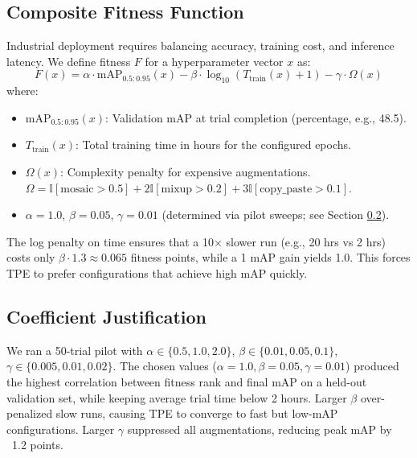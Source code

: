 \documentclass[10pt,twocolumn,letterpaper]{article}
\begin{document}
\subsection{Composite Fitness Function}
Industrial deployment requires balancing accuracy, training cost, and inference latency. We define fitness $F$ for a hyperparameter vector $x$ as:
\begin{equation}
F(x) = \alpha \cdot \text{mAP}_{0.5:0.95}(x) - \beta \cdot \log_{10}(T_{\text{train}}(x) + 1) - \gamma \cdot \Omega(x)
\label{eq:fitness}
\end{equation}
where:
\begin{itemize}
    \item $\text{mAP}_{0.5:0.95}(x)$: Validation mAP at trial completion (percentage, e.g., 48.5).
    \item $T_{\text{train}}(x)$: Total training time in hours for the configured epochs.
    \item $\Omega(x)$: Complexity penalty for expensive augmentations. $\Omega = \mathbb{I}[\text{mosaic}>0.5] + 2\mathbb{I}[\text{mixup}>0.2] + 3\mathbb{I}[\text{copy\_paste}>0.1]$.
    \item $\alpha=1.0$, $\beta=0.05$, $\gamma=0.01$ (determined via pilot sweeps; see Section \ref{sec:coeff}).
\end{itemize}
The log penalty on time ensures that a 10$\times$ slower run (e.g., 20 hrs vs 2 hrs) costs only $\beta \cdot 1.3 \approx 0.065$ fitness points, while a 1 mAP gain yields 1.0. This forces TPE to prefer configurations that achieve high mAP quickly.

\subsection{Coefficient Justification}
\label{sec:coeff}
We ran a 50-trial pilot with $\alpha\in\{0.5,1.0,2.0\}$, $\beta\in\{0.01,0.05,0.1\}$, $\gamma\in\{0.005,0.01,0.02\}$. The chosen values ($\alpha=1.0, \beta=0.05, \gamma=0.01$) produced the highest correlation between fitness rank and final mAP on a held-out validation set, while keeping average trial time below 2 hours. Larger $\beta$ over-penalized slow runs, causing TPE to converge to fast but low-mAP configurations. Larger $\gamma$ suppressed all augmentations, reducing peak mAP by ~1.2 points.
\end{document}
